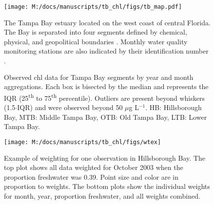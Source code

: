\documentclass[letterpaper,12pt,oneside]{article}\usepackage{graphicx, color}
\newcommand{\mugl}{$\mu$g L$^{-1}$}
\begin{document}

\begin{figure}
\centering
\texttt{[image: M:/docs/manuscripts/tb\_chl/figs/tb\_map.pdf]}
\caption{The Tampa Bay estuary located on the west coast of central Florida. The Bay is separated into four segments defined by chemical, physical, and geopolitical boundaries \citep{Lewis85}. Monthly water quality monitoring stations are also indicated by their identification number \citep{Boler01}.}
\label{fig:tb_map}
\end{figure}



\begin{figure}
\centering
{}


\leavevmode\smash{\makebox[0pt]{\hspace{0em}%
  \rotatebox[origin=l]{90}{\hspace{19em}%
    Chlorophyll-\textit{a} (\mugl)}%
}}\hspace{0pt plus 1filll}\null

\caption{Observed \ac{chl} data for Tampa Bay segments by \protect{} year and \protect{} month aggregations.  Each box is bisected by the median and represents the \ac{IQR} (25\textsuperscript{th} to 75\textsuperscript{th} percentile).  Outliers are present beyond whiskers (1.5$\cdot$\ac{IQR}) and were observed beyond 50 \mugl.  HB: Hillsborough Bay, MTB: Middle Tampa Bay, OTB: Old Tampa Bay, LTB: Lower Tampa Bay.}
\label{fig:obsyrmo}
\end{figure}

\begin{figure}[!ht]


{\centering \texttt{[image: M:/docs/manuscripts/tb\_chl/figs/wtex]} 

}

\caption[Example of weighting for one observation in Hillsborough Bay]{Example of weighting for one observation in Hillsborough Bay.  The top plot shows all data weighted for October 2003 when the proportion freshwater was 0.39.  Point size and color are in proportion to weights.  The bottom plots show the individual weights for month, year, proportion freshwater, and all weights combined.\label{fig:wtex}}
\end{figure}
\end{document}

